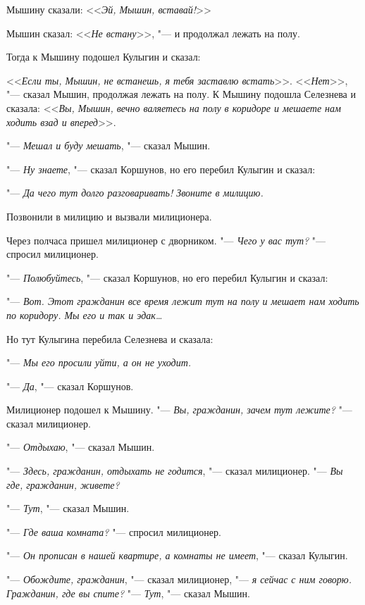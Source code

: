 \hspace*{\parindent}Мышину сказали: <<\textit{Эй, Мышин, вставай!}>>

Мышин сказал: <<\textit{Не встану}>>, "--- и продолжал 
лежать на полу.

Тогда к Мышину подошел Кулыгин и сказал:

<<\textit{Если ты, Мышин, не встанешь, я тебя заставлю встать}>>. <<\textit{Нет}>>,  "--- сказал Мышин, продолжая лежать на полу. К Мышину подошла  Селезнева и сказала: <<\textit{Вы, Мышин,  вечно валяетесь на полу в коридоре и мешаете нам ходить
взад и вперед}>>.

"--- \textit{Мешал и буду мешать}, "--- сказал Мышин.

"--- \textit{Ну знаете},  "---  сказал Коршунов, но его
перебил Кулыгин и сказал:

"--- \textit{Да чего тут  долго разговаривать! Звоните в милицию.}

Позвонили в милицию и вызвали милиционера.

Через  полчаса пришел милиционер с дворником.
"--- \textit{Чего у вас тут?} "--- спросил милиционер.

"--- \textit{Полюбуйтесь}, "--- сказал Коршунов, но его
перебил Кулыгин и сказал:

"--- \textit{Вот.  Этот  гражданин  все время лежит
тут на полу и мешает нам ходить по коридору.
Мы его и так и эдак\dots}

Но  тут Кулыгина  перебила  Селезнева  и
сказала:

"--- \textit{Мы его просили уйти, а он не уходит.}

"--- \textit{Да}, "--- сказал Коршунов.

Милиционер подошел к Мышину.
"--- \textit{Вы,  гражданин,  зачем  тут лежите?}  "---
сказал милиционер.

"--- \textit{Отдыхаю}, "--- сказал Мышин.

"--- \textit{Здесь, гражданин, отдыхать не годится},
"---  сказал милиционер.  "---  \textit{Вы где, гражданин,
живете?}

"--- \textit{Тут}, "--- сказал Мышин.

"--- \textit{Где ваша комната?}  "---  спросил милиционер.

"--- \textit{Он прописан в нашей квартире, а комнаты не имеет}, "--- сказал Кулыгин.

"--- \textit{Обождите, гражданин}, "--- сказал милиционер, "--- \textit{я сейчас с ним говорю. Гражданин, где
вы спите?}
"--- \textit{Тут}, "--- сказал Мышин.

